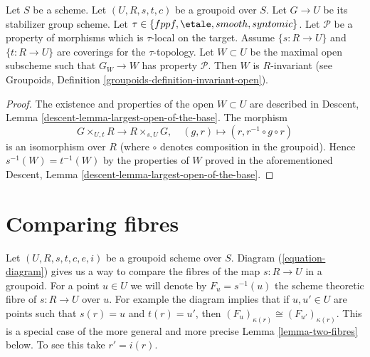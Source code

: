\begin{lemma}
\label{lemma-property-G-invariant}
Let $S$ be a scheme.
Let $(U, R, s, t, c)$ be a groupoid over $S$.
Let $G \to U$ be its stabilizer group scheme.
Let $\tau \in \{fppf, \linebreak[0] \etale, \linebreak[0]
smooth, \linebreak[0] syntomic\}$.
Let $\mathcal{P}$ be a property of morphisms which is $\tau$-local
on the target. Assume $\{s : R \to U\}$ and $\{t : R \to U\}$ are coverings
for the $\tau$-topology. Let $W \subset U$ be the maximal open subscheme
such that $G_W \to W$ has property $\mathcal{P}$. Then $W$ is $R$-invariant
(see
Groupoids, Definition
\ref{groupoids-definition-invariant-open}).
\end{lemma}

\begin{proof}
The existence and properties of the open $W \subset U$ are described in
Descent, Lemma \ref{descent-lemma-largest-open-of-the-base}.
The morphism
$$
G \times_{U, t} R \longrightarrow R \times_{s, U} G, \quad
(g, r) \longmapsto (r, r^{-1} \circ g \circ r)
$$
is an isomorphism over $R$ (where $\circ$ denotes
composition in the groupoid). Hence $s^{-1}(W) = t^{-1}(W)$ by the
properties of $W$ proved in the aforementioned
Descent, Lemma \ref{descent-lemma-largest-open-of-the-base}.
\end{proof}



\section{Comparing fibres}
\label{section-fibres}

\noindent
Let $(U, R, s, t, c, e, i)$ be a groupoid scheme over $S$.
Diagram (\ref{equation-diagram})
gives us a way to compare the fibres of the map $s : R \to U$ in a groupoid.
For a point $u \in U$ we will denote by $F_u = s^{-1}(u)$ the scheme
theoretic fibre of $s : R \to U$ over $u$. For example the diagram
implies that if $u, u' \in U$ are points such
that $s(r) = u$ and $t(r) = u'$, then
$(F_u)_{\kappa(r)} \cong (F_{u'})_{\kappa(r)}$.
This is a special case of the more general and more precise
Lemma \ref{lemma-two-fibres}
below. To see this take $r' = i(r)$.

